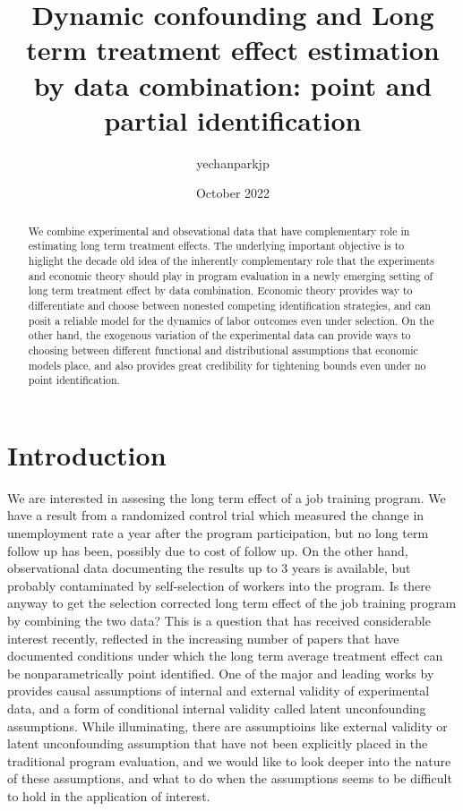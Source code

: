 \documentclass{article}
\title{Dynamic confounding and Long term treatment effect estimation by data combination: point and partial identification}
\author{yechanparkjp}
\date{October 2022}
\begin{document}
\maketitle

\begin{abstract}

    We combine experimental and obsevational data that have complementary role in estimating long term treatment effects. The underlying important objective is to higlight the decade old idea of the inherently complementary role that the experiments and economic theory should play in program evaluation in a newly emerging setting of long term treatment effect by data combination. Economic theory provides way to differentiate and choose between nonested competing identification strategies, and can posit a reliable model for the dynamics of labor outcomes even under selection. On the other hand, the exogenous variation of the experimental data can provide ways to choosing between different functional and distributional assumptions that economic models place, and also provides great credibility for tightening bounds even under no point identification.
\end{abstract}

\section{Introduction}

We are interested in assesing the long term effect of a job training program. We have a result from a randomized control trial which measured the change in unemployment rate a year after the program participation, but no long term follow up has been, possibly due to cost of follow up. On the other hand, observational data documenting the results up to 3 years is available, but probably contaminated by self-selection of workers into the program. Is there anyway to get the selection corrected long term effect of the job training program by combining the two data? This is a question that has received considerable interest recently, reflected in the increasing number of papers that have documented conditions under which the long term average treatment effect can be nonparametrically point identified. One of the major and leading works by \cite{athey 2020 long}  provides causal assumptions of internal and external validity of experimental data, and a form of conditional internal validity called latent unconfounding assumptions. While illuminating, there are assumptioins like external validity or latent unconfounding assumption that have not been explicitly placed in the traditional program evaluation, and we would like to look deeper into the nature of these assumptions, and what to do when the assumptions seems to be difficult to hold in the application of interest. 
\end{document}
